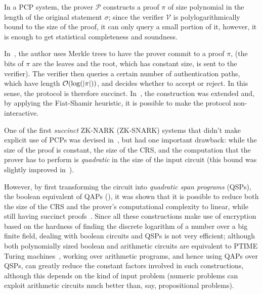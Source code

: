 In a PCP system, the prover \(\mathcal{P}\) constructs a proof \(\pi \) of size polynomial in the 
length of the original statement \(\sigma \); since the verifier \(\mathcal{V}\) is 
polylogarithmically bound to the size of the proof, it can only query a small portion of it, 
however, it is enough to get statistical completeness and soundness.

In~\cite{Kilian1992}, the author uses Merkle trees to have the prover commit to a proof \(\pi \), 
(the bits of \(\pi \) are the leaves and the root, which has constant size, is sent to the verifier). 
The verifier then queries a certain number of authentication paths, which have length
\(\BigO{\call{\log}{\abs{\pi}}}\), and decides whether to accept or reject.
In this sense, the protocol is therefore succinct.
In~\cite{Micali2000}, the construction was extended and, by applying the Fiat-Shamir heuristic, it 
is possible to make the protocol non-interactive.

One of the first \emph{succinct} ZK-NARK (ZK-SNARK) systems that didn't make explicit use of 
PCPs was devised in~\cite{Groth2010}, but had one important drawback: while the size of the proof 
is constant, the size of the CRS, and the computation that the prover has to perform is 
\emph{quadratic} in the size of the input circuit
(this bound was slightly improved in~\cite{Lipmaa2011}).

However, by first transforming the circuit into \emph{quadratic span programs} (QSPs), 
the boolean equivalent of QAPs (), it was shown that it is possible to reduce both 
the size of the CRS and the prover's computational complexity to linear, while still having succinct 
proofs~\cite{GennaroGPR2012}.
Since all these constructions make use of encryption based on the hardness of finding the discrete
logarithm of a number over a big finite field, dealing with boolean circuits and QSPs is not 
very efficient; although both polynomially sized boolean and arithmetic circuits are equivalent to 
\textsc{PTIME} Turing machines~\cite{PippengerF1979}, working over arithmetic programs, and hence 
using QAPs over QSPs, can greatly reduce the constant factors involved 
in such constructions, although this depends on the kind of input problem (numeric problems 
can exploit arithmetic circuits much better than, say, propositional problems).


